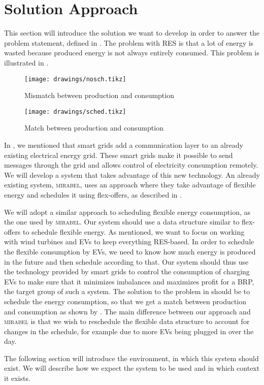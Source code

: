 \section{Solution Approach}\label{sec:solapproach}
This section will introduce the solution we want to develop in order to answer the problem statement, defined in . The problem with RES is that a lot of energy is wasted because produced energy is not always entirely consumed. This problem is illustrated in . 

\begin{figure}[!htb]
	\centering
	\texttt{[image: drawings/nosch.tikz]}
	\caption{Mismatch between production and consumption}\label{fig:unschedeng}
	\texttt{[image: drawings/sched.tikz]}
	\caption{Match between production and consumption}\label{fig:schedeng}
\end{figure}

In , we mentioned that smart grids add a communication layer to an already existing electrical energy grid. These smart grids make it possible to send messages through the grid and allows control of electricity consumption remotely. We will develop a system that takes advantage of this new technology. An already existing system, \textsc{mirabel}, uses an approach where they take advantage of flexible energy and schedules it using flex-offers, as described in . 

We will adopt a similar approach to scheduling flexible energy consumption, as the one used by \textsc{mirabel}. Our system should use a data structure similar to flex-offers to schedule flexible energy. As mentioned, we want to focus on working with wind turbines and EVs to keep everything RES-based. In order to schedule the flexible consumption by EVs, we need to know how much energy is produced in the future and then schedule according to that. Our system should thus use the technology provided by smart grids to control the consumption of charging EVs to make sure that it minimizes imbalances and maximizes profit for a BRP, the target group of such a system. The solution to the problem in  should be to schedule the energy consumption, so that we get a match between production and consumption as shown by . The main difference between our approach and \textsc{mirabel} is that we wish to reschedule the flexible data structure to account for changes in the schedule, for example due to more EVs being plugged in over the day. 

The following section will introduce the environment, in which this system should exist. We will describe how we expect the system to be used and in which context it exists.
